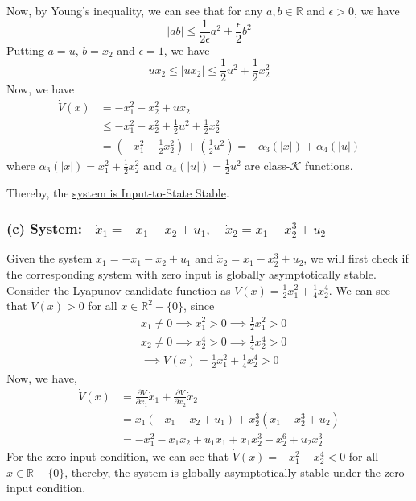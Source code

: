 Now, by Young's inequality, we can see that for any \( a, b \in \mathbb{R} \) and \( \epsilon > 0 \), we have
\begin{equation*}
    \left| a b \right|
    \leq
    \frac{1}{2 \epsilon} a^2 + \frac{\epsilon}{2} b^2
\end{equation*}
Putting \( a = u \), \( b = x_2 \) and \( \epsilon = 1 \), we have
\begin{equation*}
    u x_2 \leq \left| u x_2 \right|
    \leq
    \frac{1}{2} u^2 + \frac{1}{2} x_2^2
\end{equation*}
Now, we have
\begin{align*}
    \dot{V}(x)
     & =
    -x_1^2 - x_2^2 + u x_2
    \\ & \leq
    -x_1^2 - x_2^2 + \frac{1}{2} u^2 + \frac{1}{2} x_2^2
    \\ & =
    \left( -x_1^2 - \frac{1}{2} x_2^2 \right) + \left( \frac{1}{2} u^2 \right)
    =
    - \alpha_3(|x|) + \alpha_4(|u|)
\end{align*}
where \( \alpha_3(|x|) = x_1^2 + \frac{1}{2} x_2^2 \) and \( \alpha_4(|u|) = \frac{1}{2} u^2 \) are class-\( \mathcal{K} \) functions.

Thereby, the \underline{system is Input-to-State Stable}.

\clearpage
\subsubsection*{(c) System:\( \quad \dot{x}_{1}=-x_{1}-x_{2}+u_{1}, \quad \dot{x}_{2}=x_{1}-x_{2}^{3}+u_{2} \)}

Given the system \( \dot{x}_{1}=-x_{1}-x_{2}+u_{1} \) and \( \dot{x}_{2}=x_{1}-x_{2}^{3}+u_{2} \), we will first check if the corresponding system with zero input is globally asymptotically stable.
Consider the Lyapunov candidate function as \( V(x)=\frac{1}{2} x_{1}^{2}+\frac{1}{4} x_{2}^{4} \).
We can see that \( V(x) > 0 \) for all \( x \in \mathbb{R}^2 - \{ 0 \} \), since
\begin{align*}
     &
    x_1 \neq 0
    \implies
    x_1^2 > 0
    \implies
    \frac{1}{2} x_1^2 > 0
    \\
     &
    x_2 \neq 0
    \implies
    x_2^4 > 0
    \implies
    \frac{1}{4} x_2^4 > 0
    \\
     &
    \implies
    V(x)
    =
    \frac{1}{2} x_1^2 + \frac{1}{4} x_2^4
    > 0
\end{align*}
Now, we have,
\begin{align*}
    \dot{V}(x)
     & =
    \frac{\partial V}{\partial x_1} \dot{x}_1 + \frac{\partial V}{\partial x_2} \dot{x}_2
    \\
     & =
    x_1 \left( -x_1 - x_2 + u_1 \right) + x_2^3 \left( x_1 - x_2^3 + u_2 \right)
    \\
     & =
    -x_1^2 - x_1 x_2 + u_1 x_1 + x_1 x_2^3 - x_2^6 + u_2 x_2^3
\end{align*}
For the zero-input condition, we can see that \( \dot{V}(x) = -x_1^2 - x_2^4 < 0 \) for all \( x \in \mathbb{R} - \{ 0 \} \), thereby, the system is globally asymptotically stable under the zero input condition.


